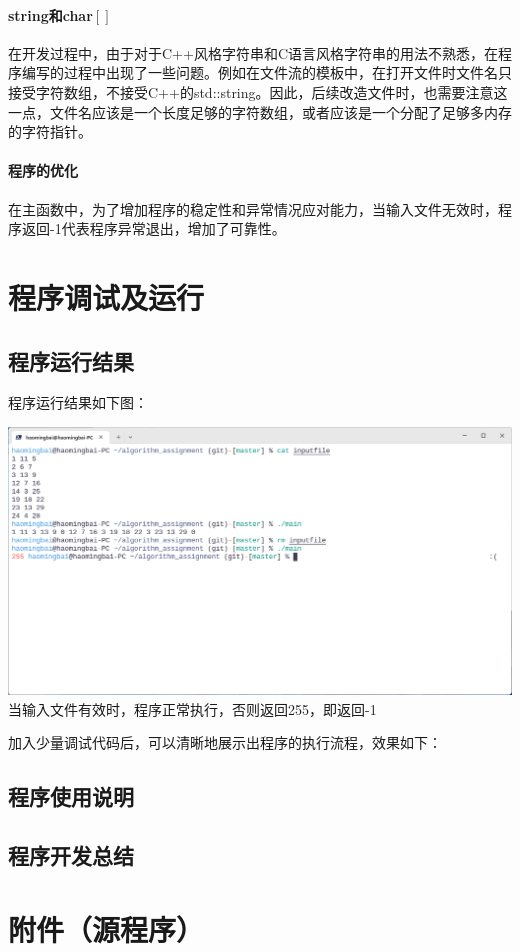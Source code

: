 \documentclass[a4paper]{ctexart}
\begin{document}
	\paragraph{string和char$[ ]$} 在开发过程中，由于对于C++风格字符串和C语言风格字符串的用法不熟悉，在程序编写的过程中出现了一些问题。例如在文件流的模板中，在打开文件时文件名只接受字符数组，不接受C++的std::string。因此，后续改造文件时，也需要注意这一点，文件名应该是一个长度足够的字符数组，或者应该是一个分配了足够多内存的字符指针。
	\paragraph{程序的优化} 在主函数中，为了增加程序的稳定性和异常情况应对能力，当输入文件无效时，程序返回-1代表程序异常退出，增加了可靠性。
	\section{程序调试及运行}
	\subsection{程序运行结果}
	程序运行结果如下图：
	\begin{center}
		\includegraphics[width=14cm]{program-output.png}
		当输入文件有效时，程序正常执行，否则返回255，即返回-1
	\end{center}
	加入少量调试代码后，可以清晰地展示出程序的执行流程，效果如下：
	\subsection{程序使用说明}
	\subsection{程序开发总结}
	\section{附件（源程序）}
\end{document}
